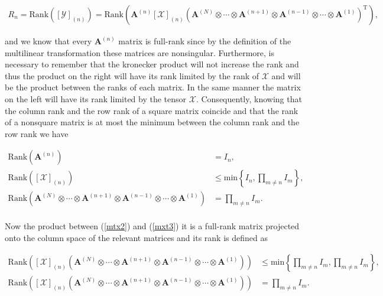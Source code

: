 \documentclass[a4paper,10pt]{article}
\begin{document}
\begin{enumerate}
        \begin{align}
            R_{n} = \text{Rank}\left( \left[ \mathcal{Y} \right]_{(n)} \right) = \text{Rank}\left( \boldsymbol{A}^{(n)} \left[ \mathcal{X} \right]_{(n)} \left( \boldsymbol{A}^{(N)} \otimes \cdots \otimes \boldsymbol{A}^{(n+1)} \otimes \boldsymbol{A}^{(n-1)} \otimes \cdots \otimes \boldsymbol{A}^{(1)} \right)^{\text{T}} \right),
        \end{align}
        
        and we know that every $\boldsymbol{A}^{(n)}$ matrix is full-rank since by the definition of the multilinear transformation these matrices are nonsingular. Furthermore, is necessary to remember that the kronecker product will not increase the rank and thus the product on the right will have its rank limited by the rank of $\mathcal{X}$ and will be the product between the ranks of each matrix. In the same manner the matrix on the left will have its rank limited by the tensor $\mathcal{X}$. Consequently, knowing that the column rank and the row rank of a square matrix coincide and that the rank of a nonsquare matrix is at most the minimum between the column rank and the row rank we have
        
        \begin{align}
            \text{Rank}\left( \boldsymbol{A}^{(n)} \right) &= I_{n}, \label{mtx1} \\
            \text{Rank}\left( \left[ \mathcal{X} \right]_{(n)} \right) &\leq \text{min} \left\{ I_{n}, \prod_{m \neq n} I_{m} \right\}, \label{mtx2} \\
            \text{Rank}\left( \boldsymbol{A}^{(N)} \otimes \cdots \otimes \boldsymbol{A}^{(n+1)} \otimes \boldsymbol{A}^{(n-1)} \otimes \cdots \otimes \boldsymbol{A}^{(1)} \right) &= \prod_{m \neq n} I_{m}. \label{mxt3}
        \end{align}
        
        \paragraph{}Now the product between (\ref{mtx2}) and (\ref{mxt3}) it is a full-rank matrix projected onto the column space of the relevant matrices and its rank is defined as
        
        \begin{align}
            \text{Rank}\left( \left[ \mathcal{X} \right]_{(n)} \left( \boldsymbol{A}^{(N)} \otimes \cdots \otimes \boldsymbol{A}^{(n+1)} \otimes \boldsymbol{A}^{(n-1)} \otimes \cdots \otimes \boldsymbol{A}^{(1)} \right) \right) &\leq \text{min} \left\{ \prod_{m \neq n} I_{m}, \prod_{m \neq n} I_{m} \right\}, \\  
            \text{Rank}\left( \left[ \mathcal{X} \right]_{(n)} \left( \boldsymbol{A}^{(N)} \otimes \cdots \otimes \boldsymbol{A}^{(n+1)} \otimes \boldsymbol{A}^{(n-1)} \otimes \cdots \otimes \boldsymbol{A}^{(1)} \right) \right) &= \prod_{m \neq n} I_{m}.
        \end{align}
        

\end{enumerate}
\end{document}

